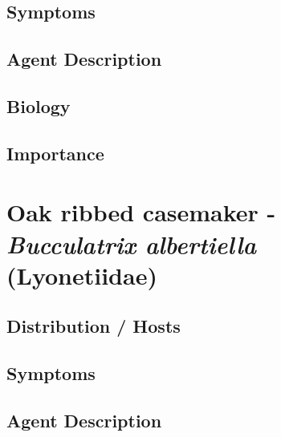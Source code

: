 \documentclass[
]{book}
\begin{document}
\subsection*{Symptoms}\label{symptoms-5}

\subsection*{Agent Description}\label{agent-description-5}

\subsection*{Biology}\label{biology-5}

\subsection*{Importance}\label{importance-5}

\section*{\texorpdfstring{Oak ribbed casemaker - \emph{Bucculatrix albertiella} (Lyonetiidae)}{Oak ribbed casemaker - Bucculatrix albertiella (Lyonetiidae)}}\label{oak-ribbed-casemaker---bucculatrix-albertiella-lyonetiidae}

\subsection*{Distribution / Hosts}\label{distribution-hosts-6}

\subsection*{Symptoms}\label{symptoms-6}

\subsection*{Agent Description}\label{agent-description-6}
\end{document}
